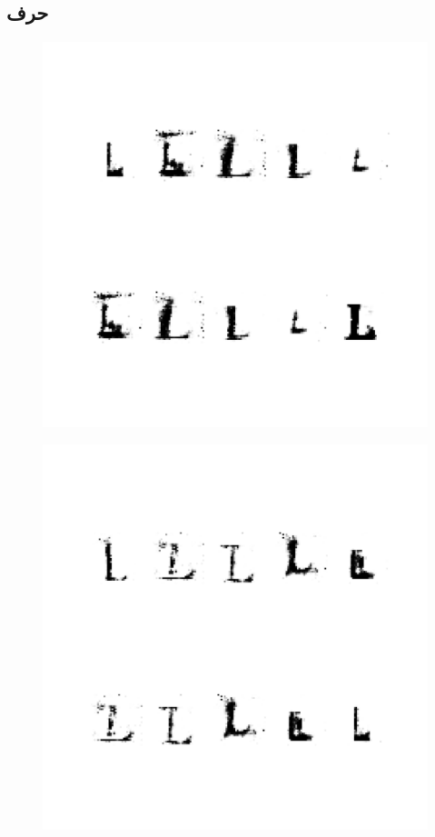 \documentclass{article}
\begin{document}
\subsection{حرف }
\begin{figure}[H]
	\centerline{\includegraphics[width=\textwidth , height=\textheight ]{../results/CGAN_Adam/figs/letters/L/95.pdf}}
\end{figure}
\begin{figure}[H]
	\centerline{\includegraphics[width=\textwidth , height=\textheight ]{../results/CGAN_Adam/figs/letters/L/90.pdf}}
\end{figure}
\end{document}
